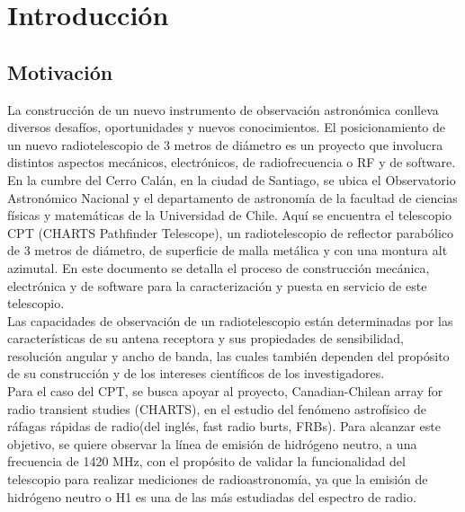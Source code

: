 \chapter{Introducción}
\section{Motivación}

La construcción de un nuevo instrumento de observación astronómica conlleva diversos desafíos, oportunidades y nuevos conocimientos. El posicionamiento de un nuevo radiotelescopio de 3 metros de diámetro es un proyecto que involucra distintos aspectos mecánicos, electrónicos, de radiofrecuencia o RF y de software.\\


En la cumbre del Cerro Calán, en la ciudad de Santiago, se ubica el Observatorio Astronómico Nacional y el departamento de astronomía de la facultad de ciencias físicas y matemáticas de la Universidad de Chile. Aquí se encuentra el telescopio CPT (CHARTS Pathfinder Telescope), un radiotelescopio de reflector parabólico de 3 metros de diámetro, de superficie de malla metálica y con una montura alt azimutal. En este documento se detalla el proceso de construcción mecánica, electrónica y de software para la caracterización y puesta en servicio de este telescopio.\\ 

Las capacidades de observación de un radiotelescopio están determinadas por las características de su antena receptora y sus propiedades de sensibilidad, resolución angular y ancho de banda, las cuales también dependen del propósito de su construcción y de los intereses científicos de los investigadores.\\

Para el caso del CPT, se busca apoyar al proyecto,  Canadian-Chilean array for radio transient studies (CHARTS), en el estudio del fenómeno astrofísico de ráfagas rápidas de radio(del inglés, fast radio burts, FRBs). Para alcanzar este objetivo, se quiere observar la línea de emisión de hidrógeno neutro, a una frecuencia de 1420 MHz, con el propósito de validar la funcionalidad del telescopio para realizar mediciones de radioastronomía, ya que la emisión de hidrógeno neutro o H1 es una de las más estudiadas del espectro de radio.\\

